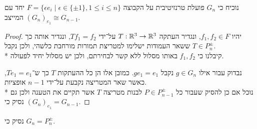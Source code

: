 \Subquestion{}
נוכיח כי $G_n$ פועלת טרנזיטיבית על הקבוצה $F = \{ \epsilon e_i \mid \epsilon \in \{ \pm 1 \}, 1 \le i \le n \}$ יחד עם המייצב ${(G_n)}_{e_1} \cong G_{n - 1}$.
\begin{proof}
	יהיו $f_1, f_2 \in F$, ונגדיר העתקה $T : \mathbb{R}^3 \to \mathbb{R}^3$ על־ידי $T f_1 = f_2$, ונגדיר אותה כך ששאר העמודות ישלימו למטריצת תמורות מורחבת כלשהי, ולכן נקבל $T \in P_n^\pm$. \\*
	קיבלנו כי $f_1, f_2$ באותו מסלול ללא קשר לבחירתם, ולכן יש מסלול יחיד לפעולה.

	נבדוק עבור אילו $g \in G_n$ נקבל $g e_1 = e_1$. כמובן אלו הן כל ההעתקות $T$ כך ש־$T e_1 = e_1$, כאשר שאר המטריצה נקבעת על־ידי $n - 1$ אופציות. \\*
	נוכל אם כן להסיק שעבור כל $P \in P_{n - 1}^\pm$ לבנות מטריצה $T$ אשר תקיים את הטענה ולכן גם נסיק כי ${(G_n)}_{e_1} = G_{n - 1}$.
\end{proof}

\Subquestion{}
נסיק כי $G_n = P_n^\pm$.


